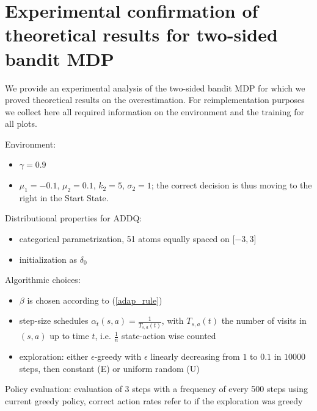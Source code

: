 \documentclass{article}
\newcommand{\E}{\mathbb{E}}
\theoremstyle{plain}
\theoremstyle{definition}
\theoremstyle{remark}
\begin{document}

\newpage

\section{Experimental confirmation of theoretical results for two-sided bandit MDP}

We provide an experimental analysis of the two-sided bandit MDP for which we proved theoretical results on the overestimation. For reimplementation purposes we collect here all required information on the environment and the training for all plots.

Environment:
\begin{itemize}
    \item $\gamma=0.9$
    \item $\mu_1=-0.1$, $\mu_2=0.1$, $k_2=5$, $\sigma_2=1$; the correct decision is thus moving to the right in the Start State.
\end{itemize}
Distributional properties for ADDQ:
\begin{itemize}
    \item categorical parametrization, 51 atoms equally spaced on $\lbrack-3,3\rbrack$
    \item initialization as $\delta_0$
\end{itemize}
Algorithmic choices:
\begin{itemize}
    \item $\beta$ is chosen according to (\ref{adap_rule})
    \item step-size schedules $\alpha_t(s,a)=\frac{1}{T_{s,a}(t)}$, with $T_{s,a}(t)$ the number of visits in $(s,a)$ up to time $t$, i.e. $\frac{1}{n}$ state-action wise counted 
    \item exploration: either $\epsilon$-greedy with $\epsilon$ linearly decreasing from $1$ to $0.1$ in $10000$ steps, then constant (E) or uniform random (U)
\end{itemize}
Policy evaluation: evaluation of 3 steps with a frequency of every 500 steps using current greedy policy, correct action rates refer to if the exploration was greedy
\end{document}
